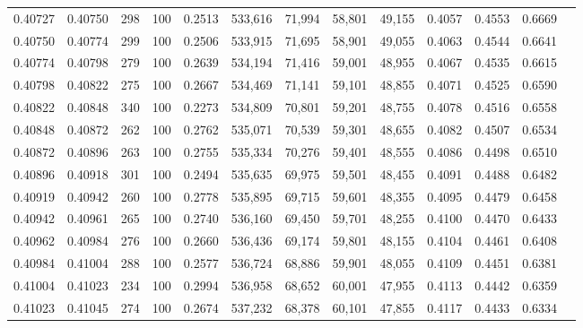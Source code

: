 \begin{tabular}{rrrrrrrrrrrrr}
0.40727 & 0.40750 &    298 & 100 &                                     0.2513 & 533,616 &  71,994 &  58,801 &  49,155 & 0.4057 & 0.4553 & 0.6669 \\
0.40750 & 0.40774 &    299 & 100 &                                     0.2506 & 533,915 &  71,695 &  58,901 &  49,055 & 0.4063 & 0.4544 & 0.6641 \\
0.40774 & 0.40798 &    279 & 100 &                                     0.2639 & 534,194 &  71,416 &  59,001 &  48,955 & 0.4067 & 0.4535 & 0.6615 \\
0.40798 & 0.40822 &    275 & 100 &                                     0.2667 & 534,469 &  71,141 &  59,101 &  48,855 & 0.4071 & 0.4525 & 0.6590 \\
0.40822 & 0.40848 &    340 & 100 &                                     0.2273 & 534,809 &  70,801 &  59,201 &  48,755 & 0.4078 & 0.4516 & 0.6558 \\
0.40848 & 0.40872 &    262 & 100 &                                     0.2762 & 535,071 &  70,539 &  59,301 &  48,655 & 0.4082 & 0.4507 & 0.6534 \\
0.40872 & 0.40896 &    263 & 100 &                                     0.2755 & 535,334 &  70,276 &  59,401 &  48,555 & 0.4086 & 0.4498 & 0.6510 \\
0.40896 & 0.40918 &    301 & 100 &                                     0.2494 & 535,635 &  69,975 &  59,501 &  48,455 & 0.4091 & 0.4488 & 0.6482 \\
0.40919 & 0.40942 &    260 & 100 &                                     0.2778 & 535,895 &  69,715 &  59,601 &  48,355 & 0.4095 & 0.4479 & 0.6458 \\
0.40942 & 0.40961 &    265 & 100 &                                     0.2740 & 536,160 &  69,450 &  59,701 &  48,255 & 0.4100 & 0.4470 & 0.6433 \\
0.40962 & 0.40984 &    276 & 100 &                                     0.2660 & 536,436 &  69,174 &  59,801 &  48,155 & 0.4104 & 0.4461 & 0.6408 \\
0.40984 & 0.41004 &    288 & 100 &                                     0.2577 & 536,724 &  68,886 &  59,901 &  48,055 & 0.4109 & 0.4451 & 0.6381 \\
0.41004 & 0.41023 &    234 & 100 &                                     0.2994 & 536,958 &  68,652 &  60,001 &  47,955 & 0.4113 & 0.4442 & 0.6359 \\
0.41023 & 0.41045 &    274 & 100 &                                     0.2674 & 537,232 &  68,378 &  60,101 &  47,855 & 0.4117 & 0.4433 & 0.6334 \\

\end{tabular}
